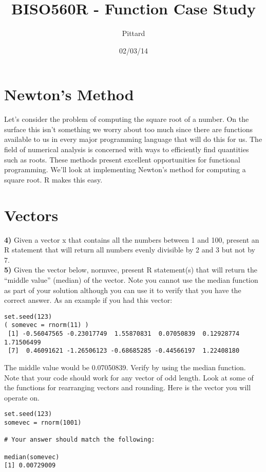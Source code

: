 \documentclass{article}
\begin{document}

\title{BISO560R - Function Case Study}
\author{Pittard}
\date{02/03/14}
\maketitle

\section*{Newton's Method}
Let's consider the problem of computing the square root of a number. On the surface this isn't something we worry about too much since there are functions available to us in every major programming language that will do this for us. The field of numerical analysis is concerned with ways to efficiently find quantities such as roots. These methods present excellent opportunities for functional programming. We'll look at implementing Newton's method for computing a square root. R makes this easy.
\\


\section*{Vectors}
\noindent
{\bf 4)} Given a vector x that contains all the numbers between 1 and 100, present an R statement that will return all numbers evenly divisible by 2 and 3 but not by 7. 
\\

\noindent
{\bf 5)} Given the vector below, normvec, present R statement(s) that will return the ``middle value'' (median) of the vector. Note you cannot use the median function as part of your solution although you can use it to verify that you have the correct answer. As an example if you had this vector:

\begin{verbatim}
set.seed(123)
( somevec = rnorm(11) )
 [1] -0.56047565 -0.23017749  1.55870831  0.07050839  0.12928774  1.71506499
 [7]  0.46091621 -1.26506123 -0.68685285 -0.44566197  1.22408180
\end{verbatim}

\noindent
The middle value would be 0.07050839. Verify by using the median function. Note that your code should work for any vector of odd length. Look at some of the functions for rearranging vectors and rounding. Here is the vector you will operate on.

\begin{verbatim}
set.seed(123)
somevec = rnorm(1001) 

# Your answer should match the following:

median(somevec)
[1] 0.00729009
\end{verbatim}
\end{document}
